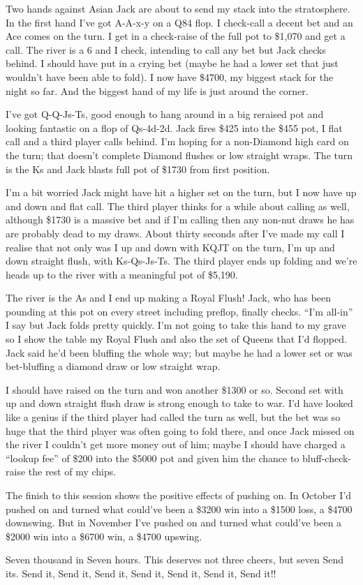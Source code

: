 Two hands against Asian Jack are about to send my stack into the
stratosphere. In the first hand I've got A-A-x-y on a Q84 flop. I
check-call a decent bet and an Ace comes on the turn. I get in a
check-raise of the full pot to \$1,070 and get a call. The river is
a 6 and I check, intending to call any bet but Jack checks behind. I
should have put in a crying bet (maybe he had a lower set that just
wouldn't have been able to fold). I now have \$4700, my biggest stack
for the night so far. And the biggest hand of my life is just around
the corner.

I've got Q-Q-Js-Ts, good enough to hang around in a big reraised pot
and looking fantastic on a flop of Qs-4d-2d. Jack fires \$425 into the
\$455 pot, I flat call and a third player calls behind. I'm hoping for
a non-Diamond high card on the turn; that doesn't complete Diamond
flushes or low straight wraps. The turn is the Ks and Jack blasts full
pot of \$1730 from first position.

I'm a bit worried Jack might have hit a higher set on the turn, but I
now have up and down and flat call. The third player thinks for a
while about calling as well, although \$1730 is a massive bet and if
I'm calling then any non-nut draws he has are probably dead to my
draws. About thirty seconds after I've made my call I realise that
not only was I up and down with KQJT on the turn, I'm up and down
straight flush, with Ks-Qs-Js-Ts. The third player ends up folding and
we're heads up to the river with a meaningful pot of \$5,190.

The river is the As and I end up making a Royal Flush! Jack, who has
been pounding at this pot on every street including preflop, finally
checks. ``I'm all-in'' I say but Jack folds pretty quickly. I'm not
going to take this hand to my grave so I show the table my Royal Flush
and also the set of Queens that I'd flopped. Jack said he'd been
bluffing the whole way; but maybe he had a lower set or was
bet-bluffing a diamond draw or low straight wrap.

I should have raised on the turn and won another \$1300 or so. Second
set with up and down straight flush draw is strong enough to take to
war. I'd have looked like a genius if the third player had called the
turn as well, but the bet was so huge that the third player was often
going to fold there, and once Jack missed on the river I couldn't get
more money out of him; maybe I should have charged a ``lookup fee'' of
\$200 into the \$5000 pot and given him the chance to
bluff-check-raise the rest of my chips.

The finish to this session shows the positive effects of pushing on.
In October I'd pushed on and turned what could've been a \$3200 win
into a \$1500 loss, a \$4700 downswing. But in November I've pushed on
and turned what could've been a \$2000 win into a \$6700 win, a \$4700
upswing.

Seven thousand in Seven hours. This deserves not three cheers, but
seven Send its. Send it, Send it, Send it, Send it, Send it, Send it,
Send it!!

